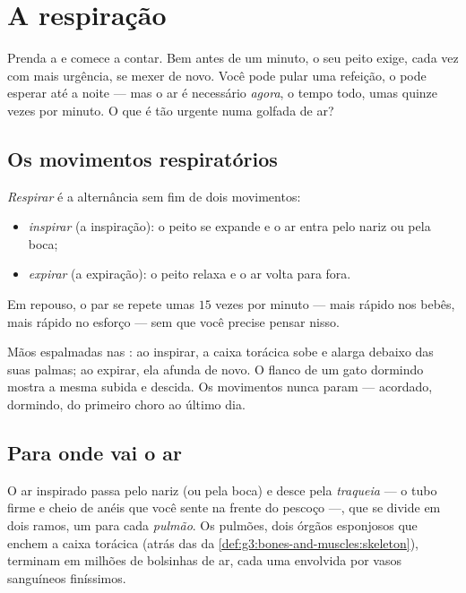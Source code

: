 \chapter{A respiração}\label{ch:g4:breathing}

Prenda a  e comece a contar. Bem antes de um minuto, o seu
peito exige, cada vez com mais urgência, se mexer de novo. Você pode
pular uma refeição, o  pode esperar até a noite --- mas o ar é
necessário \emph{agora}, o tempo todo, umas quinze vezes por minuto.
O que é tão urgente numa golfada de ar?

\section{Os movimentos respiratórios}

\begin{definition}\label{def:g4:breathing:movements}
\emph{Respirar} é a alternância sem fim de dois
movimentos:
\begin{itemize}
  \item \emph{inspirar} (a inspiração): o peito
        se expande e o ar entra pelo nariz ou pela boca;
  \item \emph{expirar} (a expiração): o peito
        relaxa e o ar volta para fora.
\end{itemize}
Em repouso, o par se repete umas $15$ vezes por minuto --- mais
rápido nos bebês, mais rápido no esforço --- sem que você precise
pensar nisso.
\end{definition}

\begin{example}\label{ex:g4:breathing:watch}
Mãos espalmadas nas : ao inspirar, a caixa torácica sobe e
alarga debaixo das suas palmas; ao expirar, ela afunda de novo. O
flanco de um gato dormindo mostra a mesma subida e descida. Os
movimentos nunca param --- acordado, dormindo, do primeiro choro ao
último dia.
\end{example}

\section{Para onde vai o ar}

\begin{definition}\label{def:g4:breathing:organs}
O ar inspirado passa pelo nariz (ou pela boca) e desce pela
\emph{traqueia} --- o tubo firme e cheio de anéis que
você sente na frente do pescoço ---, que se divide em dois ramos, um
para cada \emph{pulmão}. Os pulmões, dois órgãos
esponjosos que enchem a caixa torácica (atrás das  da
\cref{def:g3:bones-and-muscles:skeleton}), terminam em milhões de
bolsinhas de ar, cada uma envolvida por vasos sanguíneos finíssimos.
\end{definition}

